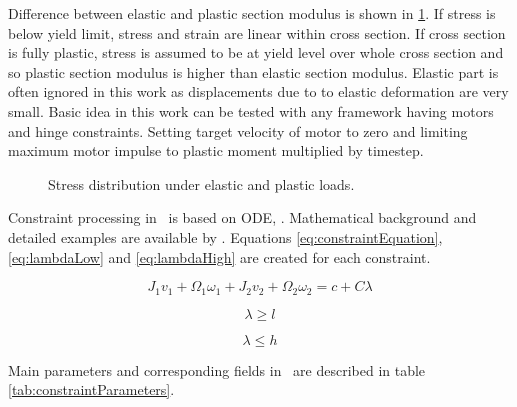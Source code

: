 Difference between elastic and plastic section modulus is shown in \ref{fig:wp}. 
If stress is below yield limit, stress and strain are linear within cross section.
If cross section is fully plastic, stress is assumed to be at yield level over whole cross section and 
so plastic section modulus is higher than elastic section modulus.
Elastic part is often ignored in this work as displacements due to to elastic deformation are very small.
Basic idea in this work can be tested with any framework having motors and hinge constraints.
Setting target velocity of motor to zero and limiting maximum motor impulse to plastic moment 
multiplied by timestep.

\begin{figure}[htb!]
\centering
{}
\hspace{1cm}
\caption{Stress distribution under elastic and plastic loads.}
\label{fig:wp}
\end{figure}

Constraint processing in \bullet\ is based on ODE, \cite{ode}.
Mathematical background and detailed examples are available by \cite{ode.joints}.
Equations \ref{eq:constraintEquation}, \ref{eq:lambdaLow} and
\ref{eq:lambdaHigh} 
are created for each constraint.

\begin{equation} \label{eq:constraintEquation}
J_1 v_1 + \Omega_1 \omega_1 + J_2 v_2 + \Omega_2 \omega_2 = c + C \lambda
\end{equation}

\begin{equation} \label{eq:lambdaLow}
\lambda \geq l
\end{equation}

\begin{equation} \label{eq:lambdaHigh}
\lambda \leq h
\end{equation}

Main parameters  and corresponding fields in \bullet\  
 are described in table \ref{tab:constraintParameters}.

